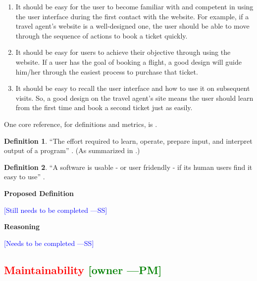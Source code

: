 \documentclass[letterpaper,cleveref]{lipics-v2019}
\newcommand{\authornote}[3]{\textcolor{#1}{[#3 ---#2]}}
\newcommand{\authornote}[3]{}
\newcommand{\wss}[1]{\authornote{blue}{SS}{#1}} %
\newcommand{\pmi}[1]{\authornote{green}{PM}{#1}} %
\newcommand{\notdone}[1]{\textcolor{red}{#1}}
\theoremstyle{definition}
\newtheorem{defn}{Definition}
\begin{document}
\begin{enumerate}
	\item It should be easy for the user to become familiar with and competent in
	using
	the user interface during the first contact with the website. For example, if a
	travel agent’s website is a well-designed one, the user should be able to move
	through the sequence of actions to book a ticket quickly.
	\item It should be easy for users to achieve their objective through using the
	website. If a user has the goal of booking a flight, a good design will guide
	him/her through the easiest process to purchase that ticket.
	\item It should be easy to recall the user interface and how to use it on
	subsequent visits. So, a good design on the travel agent’s site means the user
	should learn from the first time and book a second ticket just as easily.
\end{enumerate}

One core reference, for definitions and metrics, is
\citet{bevan1995measuring}.

\begin{defn}
	``The effort required to learn, operate, prepare input, and interpret output
	of a program'' \citep{McCallEtAl1977}. (As summarized in
	\citet{VanVliet2000}.)
\end{defn}

\begin{defn}
	``A software is usable - or user fridendly - if its human users find it easy to
	use'' \citep{ghezzi1991fundamentals}.
\end{defn}

\noindent \textbf{Proposed Definition}

\wss{Still needs to be completed}

\noindent \textbf{Reasoning}

\wss{Needs to be completed}

\subsection{\notdone{Maintainability} \pmi{owner}}
\end{document}
